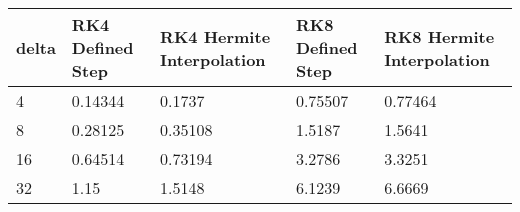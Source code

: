 \begin{tabular}{lllll}
delta & RK4 Defined Step & RK4 Hermite Interpolation & RK8 Defined Step & RK8 Hermite Interpolation \\ 
\hline 
4 & 0.14344 & 0.1737 & 0.75507 & 0.77464 \\ 
8 & 0.28125 & 0.35108 & 1.5187 & 1.5641 \\ 
16 & 0.64514 & 0.73194 & 3.2786 & 3.3251 \\ 
32 & 1.15 & 1.5148 & 6.1239 & 6.6669 \\ 
\hline 
\end{tabular}